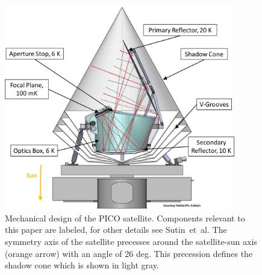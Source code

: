 \documentclass[]{spie}  %
\newcommand{\comb}[1]{\textcolor{blue}{#1}}
\begin{document}
\begin{figure} [ht]
\begin{center}
\includegraphics[height=9cm]{PICO_CAD_annotated.png}
\end{center}
\caption { \label{fig:cad} 
Mechanical design of the PICO satellite. Components relevant to this paper are labeled, for other details see Sutin~et~al.\cite{brian_spie}
The symmetry axis of the satellite precesses around the satellite-sun axis (orange arrow) with an angle of 26 deg. This precession defines the 
shadow cone which is shown in light gray.
}
\end{figure} 

\end{document}
